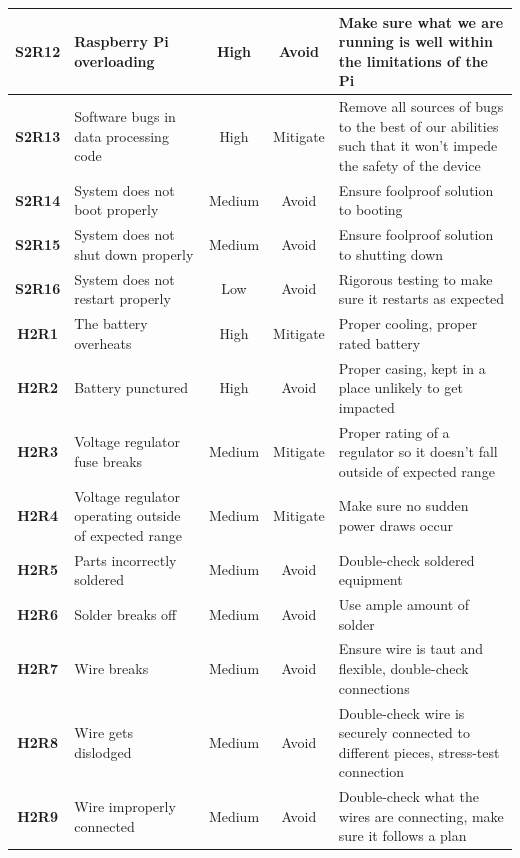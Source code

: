 \documentclass[11pt]{article}
\begin{document}
\begin{tabularx}{\textwidth}{ c  p{}  c  c  X }
                \hline
                \textbf{S2R12} & Raspberry Pi overloading & High & Avoid & Make sure what we are running is well within the limitations of the Pi \\
                \hline
                \textbf{S2R13} & Software bugs in data processing code & High & Mitigate & Remove all sources of bugs to the best of our abilities such that it won't impede the safety of the device \\
                \hline
                \textbf{S2R14} & System does not boot properly & Medium & Avoid & Ensure foolproof solution to booting \\
                \hline
                \textbf{S2R15} & System does not shut down properly & Medium & Avoid & Ensure foolproof solution to shutting down \\
                \hline
                \textbf{S2R16} & System does not restart properly & Low & Avoid & Rigorous testing to make sure it restarts as expected \\
                \hline
				\textbf{H2R1} & The battery overheats & High & Mitigate & Proper cooling, proper rated battery \\  
				\hline
				\textbf{H2R2} & Battery punctured & High  & Avoid  & Proper casing, kept in a place unlikely to get impacted \\
				\hline
				\textbf{H2R3} & Voltage regulator fuse breaks & Medium & Mitigate  & Proper rating of a regulator so it doesn't fall outside of expected range \\ 
				\hline
				\textbf{H2R4} & Voltage regulator operating outside of expected range & Medium  & Mitigate  & Make sure no sudden power draws occur \\ 
				\hline
				\textbf{H2R5} & Parts incorrectly soldered & Medium  & Avoid  & Double-check soldered equipment \\ 
				\hline
				\textbf{H2R6} & Solder breaks off & Medium & Avoid  & Use ample amount of solder \\ 
				\hline
				\textbf{H2R7} & Wire breaks & Medium  & Avoid  & Ensure wire is taut and flexible, double-check connections \\ 
				\hline
				\textbf{H2R8} & Wire gets dislodged & Medium & Avoid  & Double-check wire is securely connected to different pieces, stress-test connection \\ 
				\hline
				\textbf{H2R9} & Wire improperly connected & Medium & Avoid  & Double-check what the wires are connecting, make sure it follows a plan \\ 

\end{tabularx}
\end{document}
